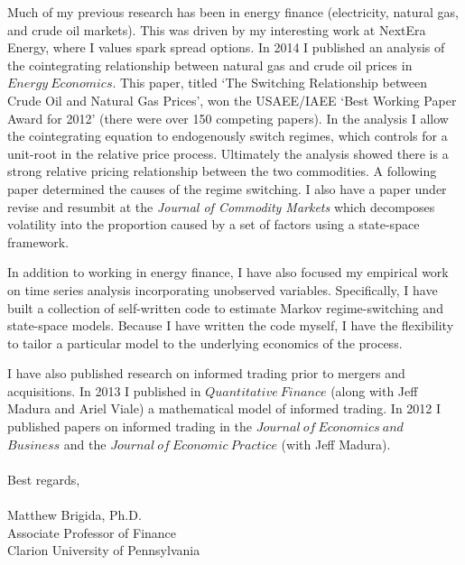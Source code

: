 \documentclass[12pt]{article}
\begin{document}
Much of my previous research has been in energy finance (electricity, natural gas, and crude oil markets).  This was driven by my interesting work at NextEra Energy, where I values spark spread options.  In 2014 I published an analysis of the cointegrating relationship between natural gas and crude oil prices in $Energy\ Economics$.  This paper, titled `The Switching Relationship between Crude Oil and Natural Gas Prices', won the USAEE/IAEE `Best Working Paper Award for 2012' (there were over 150 competing papers).  In the analysis I allow the cointegrating equation to endogenously switch regimes, which controls for a unit-root in the relative price process. Ultimately the analysis showed there is a strong relative pricing relationship between the two commodities.  A following paper determined the causes of the regime switching.  I also have a paper under revise and resumbit at the {\it Journal of Commodity Markets} which decomposes volatility into the proportion caused by a set of factors using a state-space framework.

In addition to working in energy finance, I have also focused my empirical work on time series analysis incorporating unobserved variables.  Specifically, I have built a collection of self-written code to estimate Markov regime-switching and state-space models.  Because I have written the code myself, I have the flexibility to tailor a particular model to the underlying economics of the process.  



I have also published research on informed trading prior to mergers and acquisitions.  In 2013 I published in $Quantitative\ Finance$ (along with Jeff Madura and Ariel Viale) a mathematical model of informed trading.  In 2012 I published papers on informed trading in the $Journal\ of\ Economics\ and$ \\ $ Business$ and the $Journal\ of\ Economic\ Practice$ (with Jeff Madura). 
\\
\\
Best regards,\\
\\
Matthew Brigida, Ph.D.\\
Associate Professor of Finance\\
Clarion University of Pennsylvania
\end{document}
